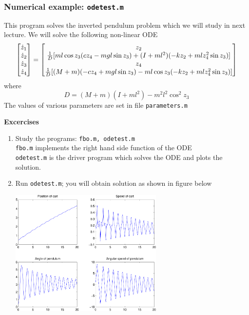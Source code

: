 \documentclass[11pt,xcolor=svgnames,onlymath]{beamer}
\begin{document}
\begin{frame}
\frametitle{Numerical example: {\tt odetest.m}}
This program solves the inverted pendulum problem which we will study in next lecture. We will solve the following non-linear ODE
{\footnotesize
\[
\begin{bmatrix}
\dot{z}_1 \\ \dot{z}_2 \\ \dot{z}_3 \\ \dot{z}_4 \end{bmatrix} = \begin{bmatrix}
z_2 \\
\frac{1}{D} [ m l \cos z_3 (c z_4 - mgl\sin z_3) + (I+ml^2)(- k z_2 + ml      z_4^2 \sin      z_3)] \\
z_4 \\
\frac{1}{D}[ (M+m)(-c z_4 + mgl\sin z_3) - ml\cos z_3 (- k z_2 + ml z_4^2     \sin z_3)]
\end{bmatrix}
\]
}
where
\[
D = (M+m)(I+ml^2) - m^2 l^2 \cos^2 z_3
\]
The values of various parameters are set in file {\tt parameters.m}

{\bf Excercises}

\begin{enumerate}

\item Study the programs: {\tt fbo.m, odetest.m}\\
{\tt fbo.m} implements the right hand side function of the ODE\\
{\tt odetest.m} is the driver program which solves the ODE and plots the solution.

\item Run {\tt odetest.m}; you will obtain solution as shown in figure below
\begin{center}
\includegraphics[width=0.6\textwidth]{odetest1}
\end{center}


\end{enumerate}
\end{frame}
\end{document}
